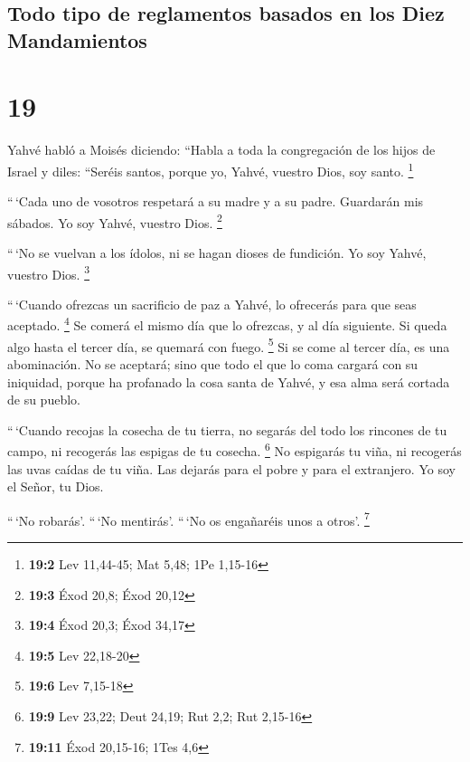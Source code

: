 \hypertarget{todo-tipo-de-reglamentos-basados-en-los-diez-mandamientos}{%
\subsection{Todo tipo de reglamentos basados \hspace{0pt}\hspace{0pt}en
los Diez
Mandamientos}\label{todo-tipo-de-reglamentos-basados-en-los-diez-mandamientos}}

\hypertarget{section-18}{%
\section{19}\label{section-18}}

 Yahvé habló a Moisés diciendo:  ``Habla a
toda la congregación de los hijos de Israel y diles: ``Seréis santos,
porque yo, Yahvé, vuestro Dios, soy santo. \footnote{\textbf{19:2} Lev
  11,44-45; Mat 5,48; 1Pe 1,15-16}

 ``\,`Cada uno de vosotros respetará a su madre y a su
padre. Guardarán mis sábados. Yo soy Yahvé, vuestro Dios. \footnote{\textbf{19:3}
  Éxod 20,8; Éxod 20,12}

 ``\,`No se vuelvan a los ídolos, ni se hagan dioses de
fundición. Yo soy Yahvé, vuestro Dios. \footnote{\textbf{19:4} Éxod
  20,3; Éxod 34,17}

 ``\,`Cuando ofrezcas un sacrificio de paz a Yahvé, lo
ofrecerás para que seas aceptado. \footnote{\textbf{19:5} Lev 22,18-20}
 Se comerá el mismo día que lo ofrezcas, y al día
siguiente. Si queda algo hasta el tercer día, se quemará con fuego.
\footnote{\textbf{19:6} Lev 7,15-18}  Si se come al tercer
día, es una abominación. No se aceptará;  sino que todo el
que lo coma cargará con su iniquidad, porque ha profanado la cosa santa
de Yahvé, y esa alma será cortada de su pueblo.

 ``\,`Cuando recojas la cosecha de tu tierra, no segarás
del todo los rincones de tu campo, ni recogerás las espigas de tu
cosecha. \footnote{\textbf{19:9} Lev 23,22; Deut 24,19; Rut 2,2; Rut
  2,15-16}  No espigarás tu viña, ni recogerás las uvas
caídas de tu viña. Las dejarás para el pobre y para el extranjero. Yo
soy el Señor, tu Dios.

 ``\,`No robarás'. ``\,`No mentirás'. ``\,`No os
engañaréis unos a otros'. \footnote{\textbf{19:11} Éxod 20,15-16; 1Tes
  4,6}

